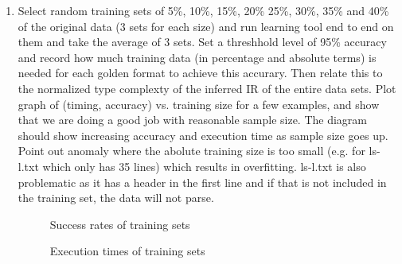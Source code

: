 \begin{enumerate}
\item Select random training sets of 5\%, 10\%, 15\%, 20\% 25\%, 30\%, 35\% and 40\% of 
the original data (3 sets for each size) and run learning tool end to end on 
them and take the average of 3 sets. 
Set a threshhold level of 95\% accuracy and record how much training data (in percentage and
absolute terms) is needed for each golden format to achieve this accurary. Then relate this
to the normalized type complexty of the inferred IR of the entire data sets.
Plot graph of (timing, accuracy) vs. training size 
for a few examples, and show that we are doing a good job with reasonable sample size. The diagram should
show increasing accuracy and execution time as sample size goes up. Point out anomaly
where the abolute training size is too small (e.g. for ls-l.txt which only has 35 lines) which results
in overfitting. ls-l.txt is also problematic as it has a header in the first line and if that is not included
in the training set, the data will not parse.

\begin{figure}
\caption{Success rates of training sets}
\end{figure}

\begin{figure}
\caption{Execution times of training sets}
\end{figure}
\end{enumerate}
